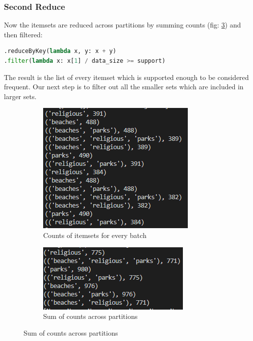 \documentclass[a4paper]{article}
\begin{document}
	
	\subsubsection{Second Reduce}
	Now the itemsets are reduced across partitions by summing counts (fig: \ref{fig:totals}) and then filtered:
	\begin{lstlisting}[language=Python]
.reduceByKey(lambda x, y: x + y)
.filter(lambda x: x[1] / data_size >= support)
	\end{lstlisting}	
	The result is the list of every itemset which is supported enough to be considered frequent. Our next step is to filter out all the smaller sets which are included in larger sets.
	
	
		
	\begin{figure}[h]
		\centering
		
		\begin{subfigure}[b]{0.4\textwidth}
			\centering
			\includegraphics[width=\textwidth]{counts.PNG}
         	\caption{Counts of itemsets for every batch}
         	\label{fig:counts}
		\end{subfigure}
		\hfill
		\begin{subfigure}[b]{0.4\textwidth}
			\centering
			\includegraphics[width=\textwidth]{totals.PNG}
         	\caption{Sum of counts across partitions}
         	\label{fig:totals}
		\end{subfigure}
	\end{figure}
	
\end{document}
